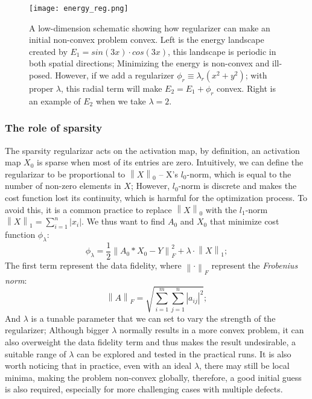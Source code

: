 \begin{figure}
	\texttt{[image: energy\_reg.png]} 
	\centering
	\caption{A low-dimension schematic showing how regularizer can make an initial non-convex problem convex. Left is the energy landscape created by $E_1 = sin(3x)\cdot cos(3x)$, this landscape is periodic in both spatial directions; Minimizing the energy is non-convex and ill-posed. However, if we add a regularizer $\phi_r \equiv \lambda_r(x^2 + y^2)$; with proper $\lambda$, this radial term will make $E_2 = E_1 + \phi_r$ convex. Right is an example of $E_2$ when we take $\lambda=2$.}
	\label{fig:ch6_reg}
\end{figure}

\subsubsection{The role of sparsity}
The sparsity regularizar acts on the activation map, by definition, an activation map $X_0$ is sparse when most of its entries are zero. Intuitively, we can define the regularizar to be proportional to $\left\lVert X\right\rVert_0$ -- X's $l_0$-norm, which is equal to the number of non-zero elements in $X$; However, $l_0$-norm is discrete and makes the cost function lost its continuity, which is harmful for the optimization process. To avoid this, it is a common practice to replace $\left\lVert X\right\rVert_0$ with the $l_1$-norm $\left\lVert X\right\rVert_1 = \sum_{i=1}^{n}\vert x_i \vert$. We thus want to find $A_0$ and $X_0$ that minimize cost function $\phi_{\lambda}$:
\begin{equation}
	\phi_{\lambda} = \frac{1}{2}\left\lVert A_0 * X_0 - Y \right\rVert^2_F + \lambda \cdot \left\lVert X\right\rVert_1;
\end{equation}
\noindent The first term represent the data fidelity, where $\left\lVert \cdot\right\rVert_F$ represent the \textit{Frobenius norm}: 
\[
\left\lVert A \right\rVert_F = \sqrt{ \sum_{i=1}^{m} \sum_{j=1}^{n} |a_{ij}|^2 };
\] 
\noindent And $\lambda$ is a tunable parameter that we can set to vary the strength of the regularizer; Although bigger $\lambda$ normally results in a more convex problem, it can also overweight the data fidelity term and thus makes the result undesirable, a suitable range of $\lambda$ can be explored and tested in the practical runs. It is also worth noticing that in practice, even with an ideal $\lambda$, there may still be local minima, making the problem non-convex globally, therefore, a good initial guess is also required, especially for more challenging cases with multiple defects. 

